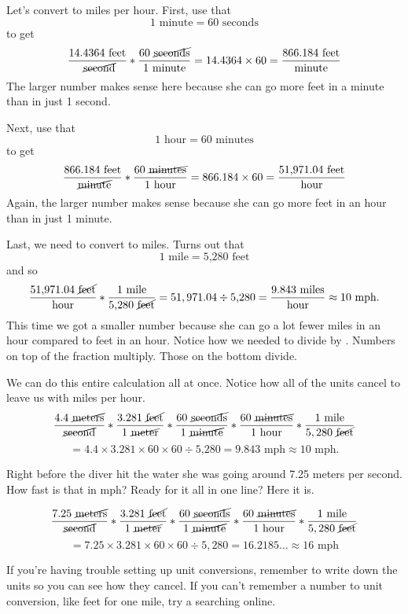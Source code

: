 Let's convert to miles per hour.  First, use that
$$1 \text{ minute} = 60 \text{ seconds}$$ to get
$$ \frac{14.4364  \text{ feet}}{\text{ \cancel{second}}} \ast \frac{60 \text{  \cancel{seconds}}}{1\text{ minute}} =  14.4364 \times 60 = \frac{866.184 \text{ feet}}{\text{minute}}$$ 
The larger number makes sense here because she can go more feet in a minute than in just 1 second.  

Next, use that
$$1 \text{ hour} = 60 \text{ minutes}$$ to get
$$ \frac{866.184 \text{ feet}}{\text{ \cancel{minute}}}\ast  \frac{60 \text{ \cancel{minutes}}}{1\text{ hour}} = 866.184 \times 60 = \frac{ \text{51,971.04 feet}}{\text{hour}}$$  
Again, the larger number makes sense because she can go more feet in an hour than in just 1 minute.  

Last, we need to convert to miles.  Turns out that 
$$1 \text{ mile} = \text{5,280 feet}$$ and so
$$ \frac{ \text{51,971.04 \cancel{feet}}}{\text{hour}}\ast  \frac{1 \text{ mile}}{\text{5,280 \cancel{feet}}} = 51,971.04 \div \text{5,280} = \frac{9.843 \text{ miles}}{\text{hour}} \approx 10 \text{ mph}.$$  
This time we got a smaller number because she can go a lot fewer miles in an hour compared to feet in an hour.  Notice how we needed to divide by .  Numbers on top of the fraction multiply. Those on the bottom divide.  %

We can do this entire calculation all at once.  Notice how all of the units cancel to leave us with miles per hour.  $$ \frac{4.4 \text{ \cancel{meters}}}{\text{\cancel{second}}} \ast \frac{3.281 \text{ \cancel{feet}}}{1 \text{ \cancel{meter}}}  \ast \frac{60 \text{ \cancel{seconds}}}{1 \text{ \cancel{minute}}}\ast  \frac{60 \text{ \cancel{minutes}}}{1\text{ hour}}\ast  \frac{1 \text{ mile}}{5,280\text{ \cancel{feet}}} $$
$$= 4.4 \times 3.281 \times 60 \times 60 \div \text{5,280} = 9.843 \text{ mph} \approx 10 \text{ mph}.$$  

Right before the diver hit the water she was going around 7.25 meters per second.  How fast is that in mph? Ready for it all in one line?  Here it is.

$$ \frac{7.25 \text{ \cancel{meters}}}{\text{\cancel{second}}} \ast \frac{3.281 \text{ \cancel{feet}}}{1 \text{ \cancel{meter}}}  \ast \frac{60 \text{ \cancel{seconds}}}{1 \text{ \cancel{minute}}}\ast  \frac{60 \text{ \cancel{minutes}}}{1\text{ hour}}\ast  \frac{1 \text{ mile}}{5,280\text{ \cancel{feet}}} $$
$$=7.25 \times 3.281 \times 60 \times 60 \div 5,280 = 16.2185\ldots \approx 16 \text{ mph}$$

If you're having trouble setting up unit conversions, remember to write down the units so you can see how they cancel.  If you can't remember a number to unit conversion, like  feet for one mile, try a searching online.


%
